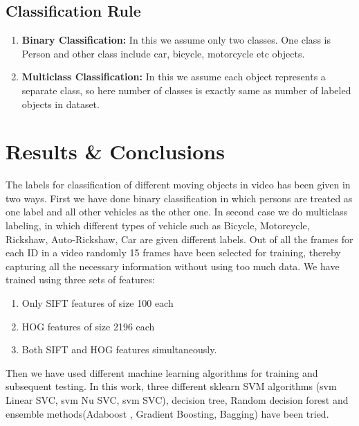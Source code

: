 \documentclass[paper=a4, fontsize=11pt]{scrartcl}
\numberwithin{equation}{section}		%
\numberwithin{figure}{section}			%
\numberwithin{table}{section}				%
\begin{document}
\subsection{ \textbf{Classification Rule } }
\begin{enumerate}
\item \textbf{Binary Classification:} In this we assume only two classes. One class is Person and other class include car, bicycle, motorcycle etc objects. 
\item \textbf{Multiclass Classification:} In this we assume each object represents a separate class, so here number of classes is exactly same as number of labeled objects in dataset.
\end{enumerate}



\section{\textbf{Results \& Conclusions}}
The labels for classification of different  moving objects in video has been given in two ways. First we have done binary classification in which persons are treated as one label and all other vehicles as the other one. In second case we do multiclass labeling, in which different types of vehicle such as Bicycle, Motorcycle, Rickshaw, Auto-Rickshaw, Car are given different labels. Out of all the frames for each ID in a video randomly 15 frames have been selected for training, thereby capturing all the necessary information without using too much data. We have trained using three sets of features: 
\begin{enumerate} \setlength\itemsep{-4pt}
\item Only SIFT features of size 100 each
\item HOG features of size 2196 each
\item Both SIFT and HOG features simultaneously. 
\end{enumerate}
Then we have used different machine learning algorithms for training and subsequent testing. In this work, three different sklearn SVM algorithms (svm Linear SVC, svm Nu SVC, svm SVC), decision tree, Random decision forest and ensemble methods(Adaboost , Gradient Boosting, Bagging) have been tried.\\
\end{document}
